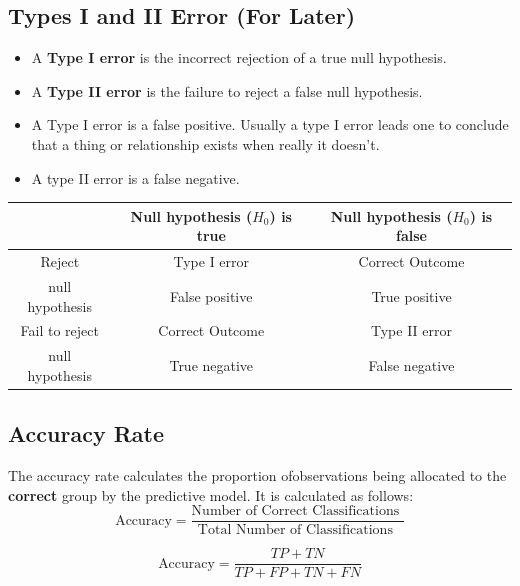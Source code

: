 \documentclass[]{report}
\begin{document}
\subsection*{Types I and II Error (For Later)}
\begin{itemize}
	\item A \textbf{Type I error} is the incorrect rejection of a true null hypothesis.
	\item A \textbf{Type II error} is the failure to reject a false null hypothesis.
	\item A Type I error is a false positive. Usually a type I error leads one to conclude that a thing
	or relationship exists when really it doesn't.
	\item A type II error is a false negative.
\end{itemize}
\begin{tabular}{|c|c|c|}
  \hline

& Null hypothesis ($H_0$) is true	& Null hypothesis ($H_0$) is false\\ \hline
Reject  & Type I error          & Correct Outcome \\
null hypothesis 			& False positive	& True positive\\ \hline
Fail to reject 	& Correct Outcome& Type II error\\
null hypothesis & True negative	& False negative\\
  \hline
\end{tabular}


\subsection*{Accuracy Rate}
The accuracy rate calculates the proportion ofobservations being allocated to the \textbf{correct} group by the predictive model. It is calculated as follows:
\[ \text{Accuracy}= \frac{
	\mbox{Number of Correct Classifications }}{\mbox{Total Number of Classifications }} \]

\[\text{Accuracy}= \frac{TP + TN}{TP+FP+TN+FN}\]

%
\end{document}
